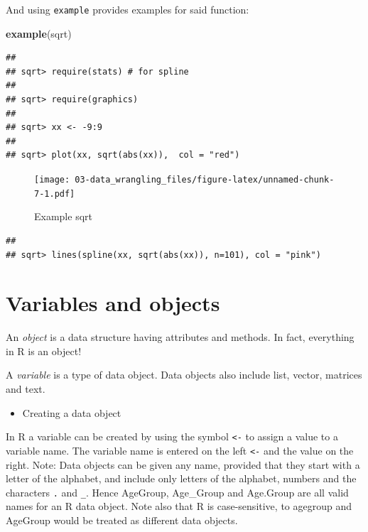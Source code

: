 \documentclass[
]{book}
\newenvironment{Shaded}{\begin{snugshade}}{\end{snugshade}}
\newcommand{\KeywordTok}[1]{\textcolor[rgb]{0.13,0.29,0.53}{\textbf{#1}}}
\newcommand{\NormalTok}[1]{#1}
\providecommand{\tightlist}{%
  \setlength{\itemsep}{0pt}\setlength{\parskip}{0pt}}
\begin{document}
And using \texttt{example} provides examples for said function:

\begin{Shaded}
\begin{Highlighting}[]
\KeywordTok{example}\NormalTok{(sqrt)}
\end{Highlighting}
\end{Shaded}

\begin{verbatim}
## 
## sqrt> require(stats) # for spline
## 
## sqrt> require(graphics)
## 
## sqrt> xx <- -9:9
## 
## sqrt> plot(xx, sqrt(abs(xx)),  col = "red")
\end{verbatim}

\begin{figure}
\centering
\texttt{[image: 03-data\_wrangling\_files/figure-latex/unnamed-chunk-7-1.pdf]}
\caption{\label{fig:unnamed-chunk-7}Example sqrt}
\end{figure}

\begin{verbatim}
## 
## sqrt> lines(spline(xx, sqrt(abs(xx)), n=101), col = "pink")
\end{verbatim}

\hypertarget{variables-and-objects}{%
\section{Variables and objects}\label{variables-and-objects}}

An \emph{object} is a data structure having attributes and methods. In fact, everything in R is an object!

A \emph{variable} is a type of data object. Data objects also include list, vector, matrices and text.

\begin{itemize}
\tightlist
\item
  Creating a data object
\end{itemize}

In R a variable can be created by using the symbol \texttt{\textless{}-} to assign a value to a variable name. The variable name is entered on the left \texttt{\textless{}-} and the value on the right. Note: Data objects can be given any name, provided that they start with a letter of the alphabet, and include only letters of the alphabet, numbers and the characters \texttt{.} and \texttt{\_}. Hence AgeGroup, Age\_Group and Age.Group are all valid names for an R data object. Note also that R is case-sensitive, to agegroup and AgeGroup would be treated as different data objects.
\end{document}
